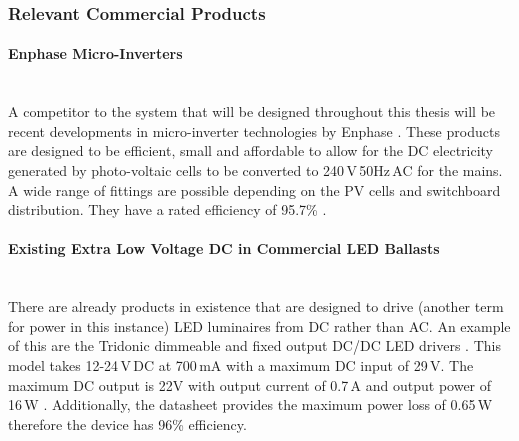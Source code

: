 \subsubsection{Relevant Commercial Products}

\paragraph{Enphase Micro-Inverters}
~\\
A competitor to the system that will be designed throughout this thesis will be recent developments in micro-inverter technologies by Enphase \cite{website:Enphase}. These products are designed to be efficient, small and affordable to allow for the DC electricity generated by photo-voltaic cells to be converted to 240\,V\,50Hz\,AC for the mains. A wide range of fittings are possible depending on the PV cells and switchboard distribution. They have a rated efficiency of 95.7\% \cite{website:Enphase}. 

\paragraph{Existing Extra Low Voltage DC in Commercial LED Ballasts}
~\\
There are already products in existence that are designed to drive (another term for power in this instance) LED luminaires from DC rather than AC. An example of this are the Tridonic dimmeable and fixed output DC/DC LED drivers \cite{website:Tridonic1}. This model takes 12-24\,V\,DC at 700\,mA with a maximum DC input of 29\,V. The maximum DC output is 22V with output current of 0.7\,A and output power of 16\,W \cite{website:Tridonic1}. Additionally, the datasheet provides the maximum power loss of 0.65\,W therefore the device has 96\% efficiency.  

\newpage
